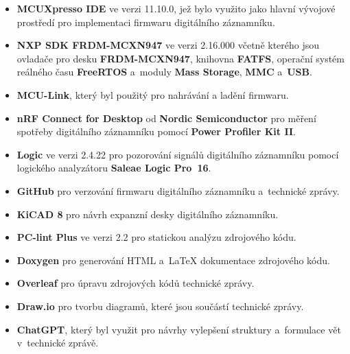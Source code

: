 \begin{itemize}
    \item \textbf{MCUXpresso IDE} ve verzi 11.10.0, jež bylo využito jako hlavní vývojové prostředí pro implementaci firmwaru digitálního záznamníku.
    \item \textbf{NXP SDK FRDM-MCXN947} ve verzi 2.16.000 včetně kterého jsou ovladače pro desku \textbf{FRDM-MCXN947}, knihovna \textbf{FATFS}, operační systém reálného času \textbf{FreeRTOS} a~moduly \textbf{Mass Storage}, \textbf{MMC} a~\textbf{USB}.
    \item \textbf{MCU-Link}, který byl použitý pro nahrávání a ladění firmwaru.
    \item \textbf{nRF Connect for Desktop} od \textbf{Nordic Semiconductor} pro měření spotřeby digitálního záznamníku pomocí \textbf{Power Profiler Kit II}.
    \item \textbf{Logic} ve verzi 2.4.22 pro pozorování signálů digitálního záznamníku pomocí logického analyzátoru \textbf{Saleae Logic Pro~16}.
    \item \textbf{GitHub} pro verzování firmwaru digitálního záznamníku a~technické zprávy.
    \item \textbf{KiCAD 8} pro návrh expanzní desky digitálního záznamníku.
    \item \textbf{PC-lint Plus} ve verzi 2.2 pro statickou analýzu zdrojového kódu. 
    \item \textbf{Doxygen} pro generování HTML a~LaTeX dokumentace zdrojového kódu.
    \item \textbf{Overleaf} pro úpravu zdrojových kódů technické zprávy.
    \item \textbf{Draw.io} pro tvorbu diagramů, které jsou součástí technické zprávy.
    \item \textbf{ChatGPT}, který byl využit pro návrhy vylepšení struktury a~formulace vět v~technické zprávě.
\end{itemize}

%
